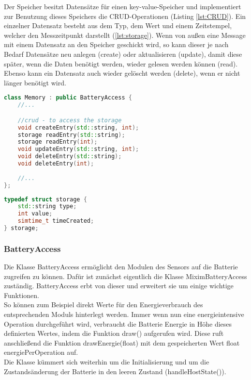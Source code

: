 Der Speicher besitzt Datensätze für einen key-value-Speicher und implementiert zur Benutzung dieses Speichers die CRUD-Operationen (Listing \ref{lst:CRUD}). Ein einzelner Datensatz besteht aus dem Typ, dem Wert und einem Zeitstempel, welcher den Messzeitpunkt darstellt (\ref{lst:storage}). Wenn von außen eine Message mit einem Datensatz an den Speicher geschickt wird, so kann dieser je nach Bedarf Datensätze neu anlegen (create) oder aktualisieren (update), damit diese später, wenn die Daten benötigt werden, wieder gelesen werden können (read). Ebenso kann ein Datensatz auch wieder gelöscht werden (delete), wenn er nicht länger benötigt wird.

\begin{minipage}{\textwidth}
\begin{lstlisting}[language=C++, label=lst:CRUD, caption=Speicherobjekt]
class Memory : public BatteryAccess {
    //...

    //crud - to access the storage
    void createEntry(std::string, int);
    storage readEntry(std::string);
    storage readEntry(int);
    void updateEntry(std::string, int);
    void deleteEntry(std::string);
    void deleteEntry(int);
    
    //...
};
\end{lstlisting}
\end{minipage}

\begin{minipage}{\textwidth}
\begin{lstlisting}[language=C++, label=lst:storage, caption=Speicherobjekt]
typedef struct storage {
    std::string type;
    int value;
    simtime_t timeCreated;
} storage;
\end{lstlisting}
\end{minipage}

\subsubsection{BatteryAccess}

Die Klasse BatteryAccess ermöglicht den Modulen des Sensors auf die Batterie zugreifen zu können. Dafür ist zunächst eigentlich die Klasse MiximBatteryAccess zuständig. BatteryAccess erbt von dieser und erweitert sie um einige wichtige Funktionen.\\
So können zum Beispiel direkt Werte für den Energieverbrauch des entsprechenden Moduls hinterlegt werden. Immer wenn nun eine energieintensive Operation durchgeführt wird, verbraucht die Batterie Energie in Höhe dieses definierten Wertes, indem die Funktion draw() aufgerufen wird. Diese ruft anschließend die Funktion drawEnergie(float) mit dem gespeicherten Wert float energiePerOperation auf. \\
Die Klasse kümmert sich weiterhin um die Initialisierung und um die Zustandsänderung der Batterie in den leeren Zustand (handleHostState()).

